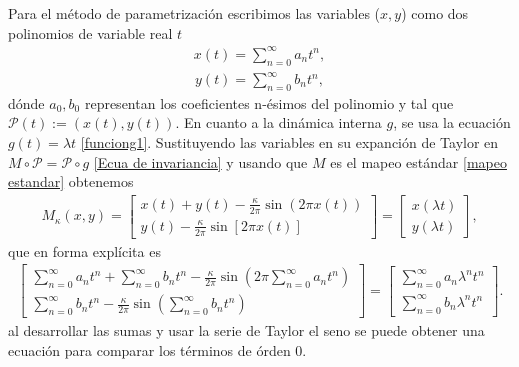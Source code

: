 Para el m\'etodo de parametrizaci\'on escribimos las variables ($x,y$) como dos polinomios de variable real $t$
\begin{eqnarray}
x(t)=\sum_{n=0}^{\infty}a_{n}t^{n}  ,
\label{x}
\end{eqnarray}
\begin{eqnarray}
y(t)=\sum_{n=0}^{\infty}b_{n}t^{n},
\label{y}
\end{eqnarray}
d\'onde $a_{0},b_{0}$ representan los coeficientes n-\'esimos del polinomio y tal que $\mathcal{P}(t):=(x(t),y(t))$. En cuanto a la dinámica interna $g$, se usa la ecuación $g(t)=\lambda t$ \eqref{funciong1}. Sustituyendo las variables en su expanci\'on de Taylor en $M\circ\mathcal{P}=\mathcal{P}\circ g$ \eqref{Ecua de invariancia}  y usando que $M$ es el mapeo est\'andar \eqref{mapeo estandar} obtenemos
\begin{eqnarray}
M_{\kappa}(x,y) = \left[\begin{array}{c}
x(t) + y(t) -\frac{\kappa}{2\pi}\sin(2\pi x(t)) \\
y(t) - \frac{\kappa}{2\pi}\sin[2\pi x(t)]
\end{array}\right] =\left[ \begin{array}{c}
x(\lambda t) \\
y(\lambda t)
\end{array}\right], 
\label{sumas en mapeo}
\end{eqnarray}
que en forma explícita es
\begin{eqnarray}
\left[\begin{array}{c}
\sum_{n=0}^{\infty}a_{n}t^{n} + \sum_{n=0}^{\infty}b_{n}t^{n} -\frac{\kappa}{2\pi}\sin\left(2\pi \sum_{n=0}^{\infty}a_{n}t^{n}\right)\\
\sum_{n=0}^{\infty}b_{n}t^{n} - \frac{\kappa}{2\pi}\sin(\sum_{n=0}^{\infty}b_{n}t^{n})
\end{array}\right] =\left[ \begin{array}{c}
\sum_{n=0}^{\infty}a_{n}\lambda^{n}t^{n} \\
\sum_{n=0}^{\infty}b_{n}\lambda^{n}t^{n}
\end{array}\right].
\label{expandida}
\end{eqnarray}
al desarrollar las sumas y usar la serie de Taylor el seno se puede obtener una ecuaci\'on para comparar los t\'erminos de \'orden 0. 

